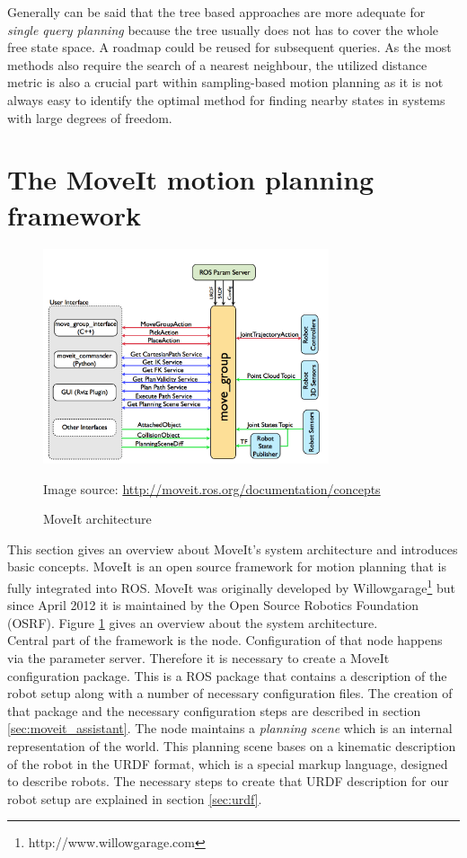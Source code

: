 Generally can be said that the tree based approaches are more adequate for \emph{single query planning} because the tree usually does not has to cover the whole free state space. A roadmap could be reused for subsequent queries. As the most methods also require the search of a nearest neighbour, the utilized distance metric is also a crucial part within sampling-based motion planning as it is not always easy to identify the optimal method for finding nearby states in systems with large degrees of freedom.  

\section{The MoveIt motion planning framework}

\begin{figure}[ht]
	\centering
	\includegraphics[width=0.75\textwidth]{images/moveit_architecture.jpg}
	\caption[Moveit architecture]{MoveIt architecture}
	{\scriptsize Image source: \url{http://moveit.ros.org/documentation/concepts}}
	\label{fig:moveit_arch}
\end{figure}

This section gives an overview about MoveIt's system architecture and introduces basic concepts. MoveIt\citep{MoveIt} is an open source framework for motion planning that is fully integrated into ROS. MoveIt was originally developed by Willowgarage\footnote{http://www.willowgarage.com} but since April 2012 it is maintained by the Open Source Robotics Foundation (OSRF). Figure \ref{fig:moveit_arch} gives an overview about the system architecture. \\

Central part of the framework is the  node. Configuration of that node happens via the parameter server. Therefore it is necessary to create a MoveIt configuration package. This is a ROS package that contains a description of the robot setup along with a number of necessary configuration files. The creation of that package and the necessary configuration steps are described in section \ref{sec:moveit_assistant}. The  node maintains a \emph{planning scene} which is an internal representation of the world. This planning scene bases on a kinematic description of the robot in the URDF format, which is a special markup language, designed to describe robots. The necessary steps to create that URDF description for our robot setup are explained in section \ref{sec:urdf}. \\

